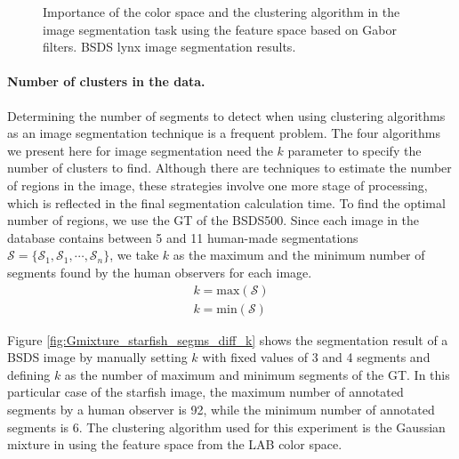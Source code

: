 \documentclass[journal]{IEEEtran}
\begin{document}
\begin{figure}[!t]
	\caption{Importance of the color space and the clustering algorithm in the image segmentation task using the feature space based on Gabor filters. BSDS lynx image segmentation results.}\label{fig:lynx_clustering_method_v_colorspace}    
\end{figure}

\paragraph{Number of clusters in the data.} 
Determining the number of segments to detect when using clustering algorithms as an image segmentation technique is a frequent problem. The four algorithms we present here for image segmentation need the $k$ parameter to specify the number of clusters to find. Although there are techniques to estimate the number of regions in the image, these strategies involve one more stage of processing, which is reflected in the final segmentation calculation time. To find the optimal number of regions, we use the GT of the BSDS500. Since each image in the database contains between 5 and 11 human-made segmentations $\mathcal{S}=\{\mathcal{S}_1, \mathcal{S}_1, \cdots, \mathcal{S}_n\}$, we take $k$ as the maximum and the minimum number of segments found by the human observers for each image. 
\begin{eqnarray}
	k = \mathrm{max}(\mathcal{S}) \\
	k = \mathrm{min}(\mathcal{S})
\end{eqnarray}

Figure \ref{fig:Gmixture_starfish_segms_diff_k} shows the segmentation result of a BSDS image by manually setting $k$ with fixed values of 3 and 4 segments and defining $k$ as the number of maximum and minimum segments of the GT. In this particular case of the starfish image, the maximum number of annotated segments by a human observer is 92, while the minimum number of annotated segments is 6. The clustering algorithm used for this experiment is the Gaussian mixture in using the feature space from the LAB color space.
\end{document}
